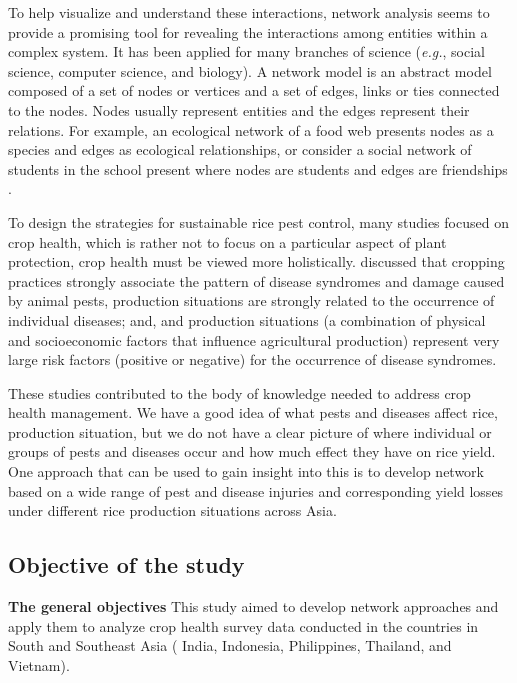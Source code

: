 To help visualize and understand these interactions, network analysis seems to provide a promising tool for revealing the interactions among entities within a complex system. It has been applied for many branches of science (\textit{e.g.}, social science, computer science, and biology). A network model is an abstract model composed of a set of nodes or vertices and a set of edges, links or ties connected to the nodes. Nodes usually represent entities and the edges represent their relations. For example, an ecological network of a food web presents nodes as a species \citep{Krause_2003_Compartments} and edges as ecological relationships, or consider a social network of students in the school present where nodes are students and edges are friendships \citep{Moody_2001_Race}.

To design the strategies for sustainable  rice pest control, many studies focused on crop health, which is rather not to focus on a particular aspect of plant protection, crop health must be viewed more holistically. \citet{Savary_1995_Use,Savary_2000_Quantification,Savary_2005_Multiple} discussed that cropping practices strongly associate the pattern of disease syndromes and damage caused by animal pests, production situations are strongly related to the occurrence of  individual diseases; and, and production situations (a combination of physical and socioeconomic factors that influence agricultural production) represent very large risk factors (positive or negative) for the occurrence of disease syndromes. 

These studies contributed to the body of knowledge needed to address crop health management. We have a good idea of what pests and diseases affect rice, production situation, but we do not have a clear picture of where individual or groups of pests and diseases occur and how much effect they have on rice yield. One approach that can be used to gain insight into this is to develop network based on a wide range of pest and disease injuries and corresponding yield losses under different rice production situations across Asia. 

\subsection{Objective of the study}

\textbf{The general objectives}
This study aimed to develop network approaches and apply them to analyze crop health survey data conducted in the countries in South and Southeast Asia ( India, Indonesia, Philippines, Thailand, and Vietnam). 

